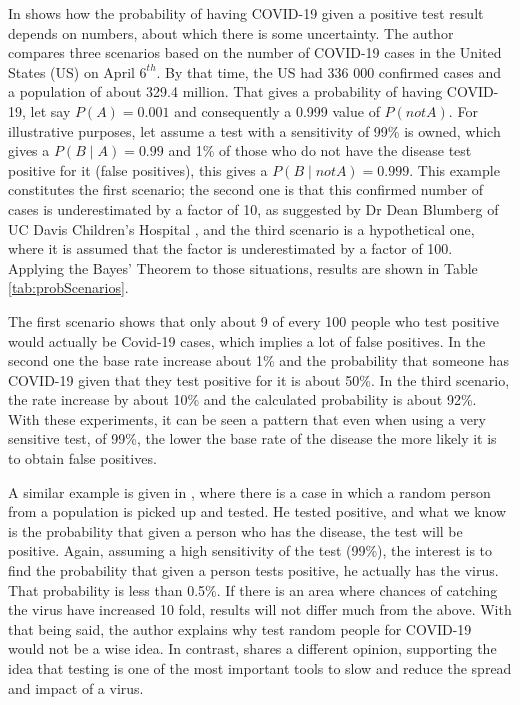 \documentclass[10pt,leter,openany]{article}
\begin{document}
	In \citet{lewis2020} shows how the probability of having COVID-19 given a positive test result depends on numbers, about which there is some uncertainty. The author compares three scenarios based on the number of COVID-19 cases in the United States (US) on April $6^{th}$. By that time, the US had 336 000 confirmed cases and a population of about 329.4 million. That gives a probability of having COVID-19, let say $P(A)  = 0.001$  and consequently a 0.999 value of $P(notA)$. For illustrative purposes, let assume a test with a sensitivity of 99\% is owned, which gives a $P(B \mid A)=0.99$ and 1\% of those who do not have the disease test positive for it (false positives), this gives a $P(B \mid notA) = 0.999$.  This example constitutes the first scenario; the second one is that this confirmed number of cases is underestimated by a factor of 10, as suggested by Dr Dean Blumberg of UC Davis Children's Hospital \citep{karlis2020}, and the third scenario is a hypothetical one, where it is assumed that the factor is underestimated by a factor of 100. Applying the Bayes' Theorem to those situations, results are shown in Table \ref{tab:probScenarios}. 
	 
	 The first scenario shows that only about 9 of every 100 people who test positive would actually be Covid-19 cases, which implies a lot of false positives. In the second one the base rate increase about 1\% and the probability that someone has COVID-19 given that they test positive for it is about 50\%. In the third scenario, the rate increase by about 10\% and the calculated probability is about 92\%. With these experiments, it can be seen a pattern that even when using a very sensitive test, of 99\%, the lower the base rate of the disease the more likely it is to obtain false positives.
	 
	 A similar example is given in \citet{archit2020}, where there is a case in which a random person from a population is picked up and tested. He tested positive, and what we know is the probability that given a person who has the disease, the test will be positive. Again, assuming a high sensitivity of the test (99\%), the interest is to find the probability that given a person tests positive, he actually has the virus. That probability is less than 0.5\%. If there is an area where chances of catching the virus have increased 10 fold, results will not differ much from the above. With that being said, the author explains why test random people for COVID-19 would not be a wise idea. In contrast, \citet*{bello2020} shares a different opinion, supporting the idea that testing is one of the most important tools to slow and reduce the spread and impact of a virus.
	 
\end{document}

